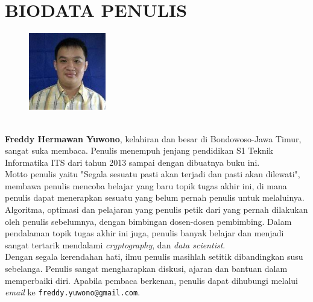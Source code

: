 \chapter{BIODATA PENULIS}
		\begin{figure}
			\includegraphics[width=0.3\textwidth]{images/foto-diri.jpg}
		\end{figure}
		\textbf{\ \\Freddy Hermawan Yuwono}, kelahiran dan besar di Bondowoso-Jawa Timur, sangat suka membaca. Penulis menempuh jenjang pendidikan S1 Teknik Informatika ITS dari tahun 2013 sampai dengan dibuatnya buku ini.\\
		
		\indent Motto penulis yaitu "Segala sesuatu pasti akan terjadi dan pasti akan dilewati", membawa penulis mencoba belajar yang baru topik tugas akhir ini, di mana penulis dapat menerapkan sesuatu yang belum pernah penulis untuk melaluinya. Algoritma, optimasi dan pelajaran yang penulis petik dari yang pernah dilakukan oleh penulis sebelumnya, dengan bimbingan dosen-dosen pembimbing. Dalam pendalaman topik tugas akhir ini juga, penulis banyak belajar dan menjadi sangat tertarik mendalami \textit{cryptography}, dan \textit{data scientist}. \\
		\indent Dengan segala kerendahan hati, ilmu penulis masihlah setitik dibandingkan susu sebelanga. Penulis sangat mengharapkan diskusi, ajaran dan bantuan dalam memperbaiki diri. Apabila pembaca berkenan, penulis dapat dihubungi melalui \textit{email} ke \texttt{freddy.yuwono@gmail.com}.


